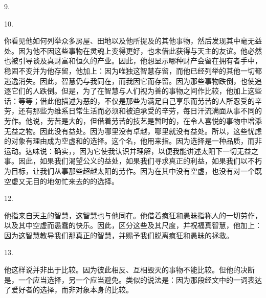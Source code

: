 9. \par

10. \par

你看见他如何列举众多房屋、田地以及他所提及的其他事物，然后发现其中毫无益处。因为他不因这些事物在灵魂上变得更好，也未借此获得与天主的友谊。他必然也被引导谈及真财富和恒久的产业。因此，他想显示哪种财产会留在拥有者手中，稳固不变并为他存留，他加上：因为唯独这智慧存留，而他已经列举的其他一切都逃逸消失。因此，智慧仍与我同在，而我因它而存留。因为那些事物跌倒，也使追逐它们的人跌倒。但是，为了在智慧与人们视为善的事物之间作比较，他加上这些话：等等；借此他描述为恶的，不仅是那些为满足自己享乐而劳苦的人所忍受的辛劳，还有那些为维系日常生活而必须和被迫承受的辛劳，每日汗流满面从事不同的劳作。他说，劳苦是大的，但借着劳苦的技艺是暂时的，在令人喜悦的事物中增添无益之物。因此没有益处。因为哪里没有卓越，哪里就没有益处。所以，这些忧虑的对象有理由成为空虚和的选择。这个名，他用来指。因为选择是一种品质，而非运动。达味说：确实，，因为它使我认识并理解，以便我能讲述太阳下一切无益之事。因此，如果我们渴望公义的益处，如果我们寻求真正的利益，如果我们以不朽为目标，让我们从事那些超越太阳的劳作。因为在其中没有空虚，也没有对一个既空虚又无目的地匆忙来去的的选择。\par

12. \par

他指来自天主的智慧，这智慧也与他同在。他借着疯狂和愚昧指称人的一切劳作，以及其中空虚而愚蠢的快乐。因此，区分这些及其尺度，并祝福真智慧，他加上：因为这智慧教导我们那真正的智慧，并赐予我们脱离疯狂和愚昧的拯救。\par

13. \par

他这样说并非出于比较。因为彼此相反、互相毁灭的事物不能比较。但他的决断是，一个应当选择，另一个应当避免。类似的说法是：因为那段经文中的一词表达了爱好者的选择，而非对象本身的比较。\par

